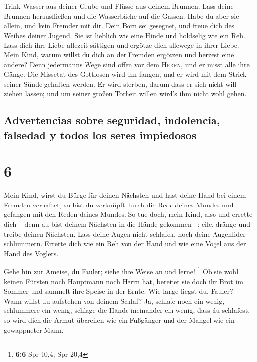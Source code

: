  Trink Wasser aus deiner Grube und Flüsse aus deinem
Brunnen.  Lass deine Brunnen herausfließen und die
Wasserbäche auf die Gassen.  Habe du aber sie allein, und
kein Fremder mit dir.  Dein Born sei gesegnet, und freue
dich des Weibes deiner Jugend.  Sie ist lieblich wie eine
Hinde und holdselig wie ein Reh. Lass dich ihre Liebe allezeit sättigen
und ergötze dich allewege in ihrer Liebe.  Mein Kind,
warum willst du dich an der Fremden ergötzen und herzest eine andere?
 Denn jedermanns Wege sind offen vor dem \textsc{Herrn},
und er misst alle ihre Gänge.  Die Missetat des Gottlosen
wird ihn fangen, und er wird mit dem Strick seiner Sünde gehalten
werden.  Er wird sterben, darum dass er sich nicht will
ziehen lassen; und um seiner großen Torheit willen wird's ihm nicht wohl
gehen.

\hypertarget{advertencias-sobre-seguridad-indolencia-falsedad-y-todos-los-seres-impiedosos}{%
\subsection{Advertencias sobre seguridad, indolencia, falsedad y todos
los seres
impiedosos}\label{advertencias-sobre-seguridad-indolencia-falsedad-y-todos-los-seres-impiedosos}}

\hypertarget{section-5}{%
\section{6}\label{section-5}}

 Mein Kind, wirst du Bürge für deinen Nächsten und hast
deine Hand bei einem Fremden verhaftet,  so bist du
verknüpft durch die Rede deines Mundes und gefangen mit den Reden deines
Mundes.  So tue doch, mein Kind, also und errette dich --
denn du bist deinem Nächsten in die Hände gekommen --: eile, dränge und
treibe deinen Nächsten.  Lass deine Augen nicht schlafen,
noch deine Augenlider schlummern.  Errette dich wie ein
Reh von der Hand und wie eine Vogel aus der Hand des Voglers.

 Gehe hin zur Ameise, du Fauler; siehe ihre Weise an und
lerne! \footnote{\textbf{6:6} Spr 10,4; Spr 20,4}  Ob sie
wohl keinen Fürsten noch Hauptmann noch Herrn hat, 
bereitet sie doch ihr Brot im Sommer und sammelt ihre Speise in der
Ernte.  Wie lange liegst du, Fauler? Wann willst du
aufstehen von deinem Schlaf?  Ja, schlafe noch ein wenig,
schlummere ein wenig, schlage die Hände ineinander ein wenig, dass du
schlafest,  so wird dich die Armut übereilen wie ein
Fußgänger und der Mangel wie ein gewappneter Mann.

